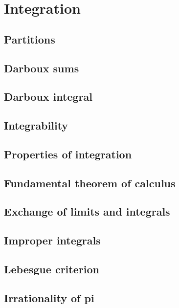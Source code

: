 \section{Integration}

\subsection{Partitions}

\subsection{Darboux sums}

\subsection{Darboux integral}

\subsection{Integrability}

\subsection{Properties of integration}

\subsection{Fundamental theorem of calculus}

\subsection{Exchange of limits and integrals}

\subsection{Improper integrals}

\subsection{Lebesgue criterion}

\subsection{Irrationality of pi}

